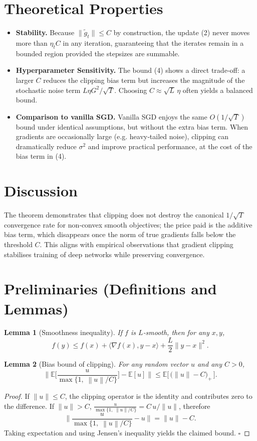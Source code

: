 \documentclass{article}
\newtheorem{lemma}{Lemma}
\newcommand{\EE}{\mathbb{E}}
\newcommand{\norm}[1]{\left\|#1\right\|}
\newcommand{\clip}[2]{\frac{#1}{\max\{1,\; \norm{#1}/#2\}}}
\begin{document}
\section*{Theoretical Properties}
\begin{itemize}
\item \textbf{Stability.} Because $\|\tilde g_t\|\le C$ by construction, the update (2) never moves more than $\eta_t C$ in any iteration, guaranteeing that the iterates remain in a bounded region provided the stepsizes are summable.
\item \textbf{Hyperparameter Sensitivity.} The bound (4) shows a direct trade‑off: a larger $C$ reduces the clipping bias term but increases the magnitude of the stochastic noise term $L\eta G^2/\sqrt{T}$. Choosing $C\approx\sqrt{L}\,\eta$ often yields a balanced bound.
\item \textbf{Comparison to vanilla SGD.} Vanilla SGD enjoys the same $O(1/\sqrt{T})$ bound under identical assumptions, but without the extra bias term. When gradients are occasionally large (e.g. heavy‑tailed noise), clipping can dramatically reduce $\sigma^2$ and improve practical performance, at the cost of the bias term in (4).
\end{itemize}

\section*{Discussion}
The theorem demonstrates that clipping does not destroy the canonical $1/\sqrt{T}$ convergence rate for non‑convex smooth objectives; the price paid is the additive bias term, which disappears once the norm of true gradients falls below the threshold $C$. This aligns with empirical observations that gradient clipping stabilises training of deep networks while preserving convergence.

\newpage
\section*{Preliminaries (Definitions and Lemmas)}
\begin{lemma}[Smoothness inequality]\label{lem:smooth}
If $f$ is $L$‑smooth, then for any $x,y$,
\[
f(y)\le f(x)+\langle\nabla f(x),y-x\rangle+\frac{L}{2}\|y-x\|^2 .
\]
\end{lemma}
\begin{lemma}[Bias bound of clipping]\label{lem:bias}
For any random vector $u$ and any $C>0$,
\[
\big\|\EE\!\big[\clip{u}{C}\big]-\EE[u]\big\|
   \le \EE\big[\,\big(\|u\|-C\big)_+\,\big].
\]
\end{lemma}
\begin{proof}
If $\|u\|\le C$, the clipping operator is the identity and contributes zero to the difference.
If $\|u\|>C$, $\clip{u}{C}=C\,u/\|u\|$, therefore
\[
\big\|\clip{u}{C}-u\big\| = \|u\|-C .
\]
Taking expectation and using Jensen’s inequality yields the claimed bound. \(\square\)
\end{proof}
\end{document}
